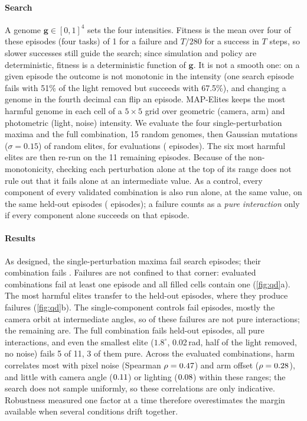 \documentclass[10pt,twocolumn,letterpaper]{article}
\begin{document}
\paragraph{Search} A genome $\bm g\in[0,1]^4$ sets the four intensities. Fitness is the mean over four of these
episodes (four tasks) of 1 for a failure and $T/280$ for a success in $T$ steps, so slower successes still
guide the search; since simulation and policy are deterministic, fitness is a deterministic function of
$\bm g$. It is not a smooth one: on a given episode the outcome is not monotonic in the intensity (one
search episode fails with 51\% of the light removed but succeeds with 67.5\%), and changing a genome in the
fourth decimal can flip an episode. MAP-Elites keeps the most harmful genome in each cell of a $5\times5$ grid over geometric
(camera, arm) and photometric (light, noise) intensity. We evaluate the four single-perturbation maxima and
the full combination, 15 random genomes, then Gaussian mutations ($\sigma=0.15$) of random elites, for
\QDEvals{} evaluations (\QDEpisodes{} episodes). The six most harmful elites are then re-run on the 11 remaining
episodes. Because of the non-monotonicity, checking each perturbation alone at the top of its range does not
rule out that it fails alone at an intermediate value. As a control, every component of every validated
combination is also run alone, at the same value, on the same held-out episodes (\QDControlEpisodes{}
episodes); a failure counts as a \emph{pure interaction} only if every component alone succeeds on that episode.

\paragraph{Results} As designed, the single-perturbation maxima fail \QDSingleFails{} search episodes; their
combination fails \QDCornerFails{}. Failures are not confined to that corner: \QDAnyFail{} evaluated combinations
fail at least one episode and all \QDFailCells{} filled cells contain one (\cref{fig:qd}a). The most harmful
elites transfer to the held-out episodes, where they produce \QDValPooled{} failures (\cref{fig:qd}b). The
single-component controls fail \QDControlFails{} episodes, mostly the camera orbit at intermediate angles,
so \QDSingleAlsoFail{} of these failures are not pure interactions; the remaining \QDPure{} are. The full
combination fails \QDValCorner{} held-out episodes, all pure interactions, and even the smallest elite
($1.8^\circ$, 0.02\,rad, half of the light removed, no noise) fails 5 of 11, 3 of them pure.
Across the evaluated combinations, harm correlates most with pixel noise (Spearman $\rho=0.47$) and
arm offset ($\rho=0.28$), and little with camera angle ($0.11$) or lighting ($0.08$) within
these ranges; the search does not sample uniformly, so these correlations are only indicative. Robustness measured
one factor at a time therefore overestimates the margin available when several conditions drift together.
\end{document}
